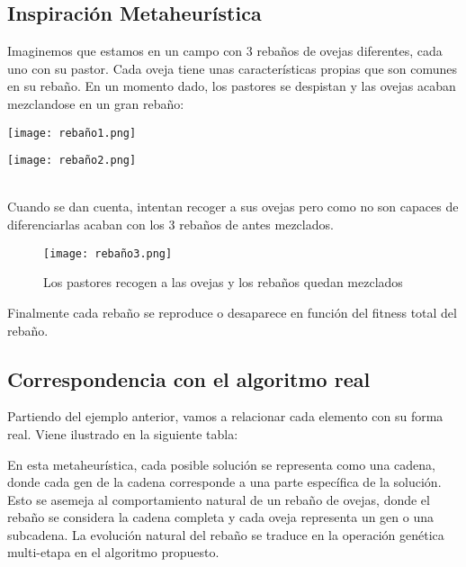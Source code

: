 \subsection{Inspiración Metaheurística}
Imaginemos que estamos en un campo con 3 rebaños de ovejas diferentes, cada uno con su pastor. Cada oveja tiene unas características propias que son comunes en su rebaño. En un momento dado, los pastores se despistan y las ovejas acaban mezclandose en un gran rebaño:

\begin{minipage}[t]{0.5\textwidth}
	\centering
	\texttt{[image: rebaño1.png]}
	\label{fig:rebaño-inicial}
\end{minipage}
\hfill
\vline
\begin{minipage}[t]{0.5\textwidth}
	\centering
	\texttt{[image: rebaño2.png]}
	\label{fig:rebaño-mezclado}
	
\end{minipage}
\quad\\
Cuando se dan cuenta, intentan recoger a sus ovejas pero como no son capaces de diferenciarlas acaban con los 3 rebaños de antes mezclados.
\begin{figure}[H]
	\centering
	\texttt{[image: rebaño3.png]}
	\label{fig:rebaño-cruzado}
	\caption{Los pastores recogen a las ovejas y los rebaños quedan mezclados}
\end{figure}
Finalmente cada rebaño se reproduce o desaparece en función del fitness total del rebaño.

\subsection{Correspondencia con el algoritmo real}
Partiendo del ejemplo anterior, vamos a relacionar cada elemento con su forma real. Viene ilustrado en la siguiente tabla:



En esta metaheurística, cada posible solución se representa como una cadena, donde cada gen de la cadena corresponde a una parte específica de la solución. Esto se asemeja al comportamiento natural de un rebaño de ovejas, donde el rebaño se considera la cadena completa y cada oveja representa un gen o una subcadena. La evolución natural del rebaño se traduce en la operación genética multi-etapa en el algoritmo propuesto.\\

